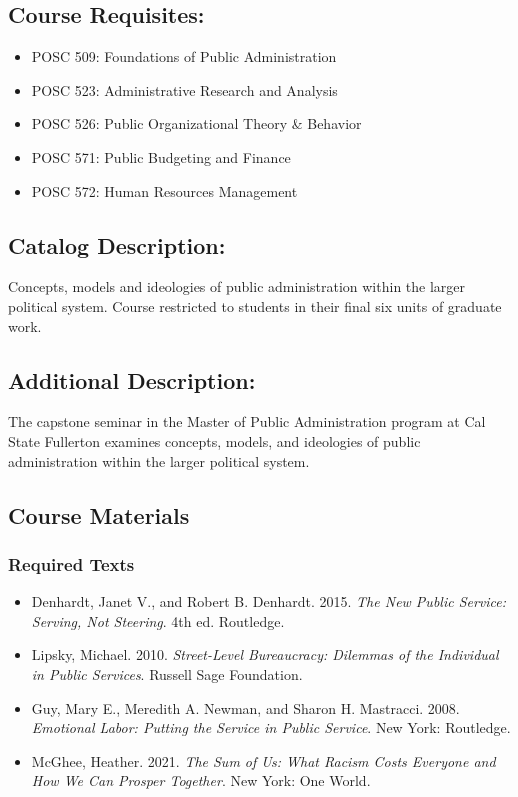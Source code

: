 \documentclass[12pt]{article}     %
\begin{document}
	\subsection*{Course Requisites:}
		\begin{itemize}
            \item POSC 509: Foundations of Public Administration
            \item POSC 523: Administrative Research and Analysis
            \item POSC 526: Public Organizational Theory \& Behavior
            \item POSC 571: Public Budgeting and Finance
            \item POSC 572: Human Resources Management
		\end{itemize}

	\subsection*{Catalog Description:} 
		Concepts, models and ideologies of public administration within the larger political system. Course restricted to students in their final six units of graduate work.

	\subsection*{Additional Description:}
		The capstone seminar in the Master of Public Administration program at Cal State Fullerton examines concepts, models, and ideologies of public administration within the larger political system.


	\subsection*{Course Materials}
	\subsubsection*{Required Texts}
    \begin{itemize}
        \item Denhardt, Janet V., and Robert B. Denhardt. 2015. \textit{The New Public Service: Serving, Not Steering}. 4th ed. Routledge.
        \item Lipsky, Michael. 2010. \textit{Street-Level Bureaucracy: Dilemmas of the Individual in Public Services}. Russell Sage Foundation.
        \item Guy, Mary E., Meredith A. Newman, and Sharon H. Mastracci. 2008. \textit{Emotional Labor: Putting the Service in Public Service}. New York: Routledge.
        \item McGhee, Heather. 2021. \textit{The Sum of Us: What Racism Costs Everyone and How We Can Prosper Together}. New York: One World.
    \end{itemize}
\end{document}

